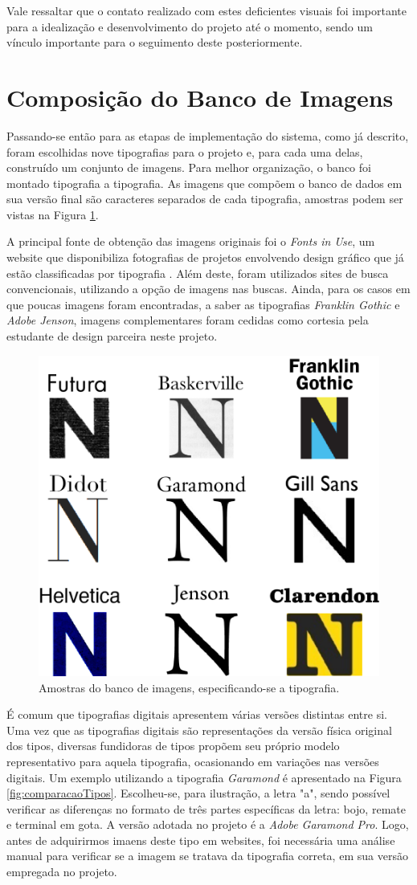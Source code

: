 Vale ressaltar que o contato realizado com estes deficientes visuais foi importante para a idealização e desenvolvimento do projeto até o momento, sendo um vínculo importante para o seguimento deste posteriormente.

\section{Composição do Banco de Imagens}

Passando-se então para as etapas de implementação do sistema, como já descrito, foram escolhidas nove tipografias para o projeto e, para cada uma delas, construído um conjunto de imagens. Para melhor organização, o banco foi montado tipografia a tipografia. As imagens que compõem o banco de dados em sua versão final são caracteres separados de cada tipografia, amostras podem ser vistas na Figura \ref{fig:nimage}.


A principal fonte de obtenção das imagens originais foi o \textit{Fonts in Use}, um website que disponibiliza fotografias de projetos envolvendo design gráfico que já estão classificadas por tipografia . Além deste, foram utilizados sites de busca convencionais, utilizando a opção de imagens nas buscas. Ainda, para os casos em que poucas imagens foram encontradas, a saber as tipografias \textit{Franklin Gothic} e \textit{Adobe Jenson}, imagens complementares foram cedidas como cortesia pela estudante de design parceira neste projeto.


\begin{figure}[H]
  \centering
  \includegraphics[width=0.4\linewidth]{figuras/nimage.pdf}
  \caption{Amostras do banco de imagens, especificando-se a tipografia.}
  \label{fig:nimage}
\end{figure}


É comum que tipografias digitais apresentem várias versões distintas entre si. Uma vez que as tipografias digitais são representações da versão física original dos tipos, diversas fundidoras de tipos propõem seu próprio modelo representativo para aquela tipografia, ocasionando em variações nas versões digitais. Um exemplo utilizando a tipografia \textit{Garamond} é apresentado na Figura \ref{fig:comparacaoTipos}. Escolheu-se, para ilustração, a letra "a", sendo possível verificar as diferenças no formato de três partes específicas da letra: bojo, remate e terminal em gota. A versão adotada no projeto é a \textit{Adobe Garamond Pro}. Logo, antes de adquirirmos imaens deste tipo em websites, foi necessária uma análise manual para verificar se a imagem se tratava da tipografia correta, em sua versão empregada no projeto.


